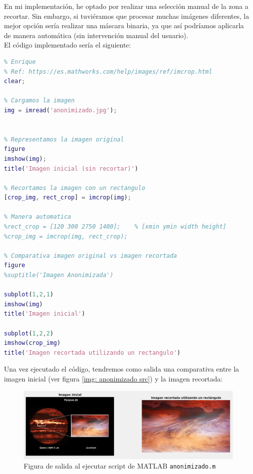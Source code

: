 \documentclass[12pt]{article}
\begin{document}
	\noindent En mi implementación, he optado por realizar una selección manual de la zona a recortar. Sin embargo, si tuviéramos que procesar muchas imágenes diferentes, la mejor opción sería realizar una máscara binaria, ya que así podríamos aplicarla de manera automática (sin intervención manual del usuario). \\
	
	\noindent El código implementado sería el siguiente:
	
	\begin{lstlisting}[language=Matlab, caption={Implementación anonimizado con \texttt{MATLAB}}]
% 1 - Anonimizado
% Enrique 
% Ref: https://es.mathworks.com/help/images/ref/imcrop.html
clear;

% Cargamos la imagen
img = imread('anonimizado.jpg');


% Representamos la imagen original
figure
imshow(img);
title('Imagen inicial (sin recortar)')

% Recortamos la imagen con un rectangulo
[crop_img, rect_crop] = imcrop(img);

% Manera automatica
%rect_crop = [120 300 2750 1400];    % [xmin ymin width height]
%crop_img = imcrop(img, rect_crop);

% Comparativa imagen original vs imagen recortada
figure
%suptitle('Imagen Anonimizada')

subplot(1,2,1)
imshow(img)
title('Imagen inicial')

subplot(1,2,2)
imshow(crop_img)
title('Imagen recortada utilizando un rectangulo')
	\end{lstlisting}

	\vspace{10px}

	\noindent Una vez ejecutado el código, tendremos como salida una comparativa entre la imagen inicial (ver figura \ref{img: anonimizado src}) y la imagen recortada:
	
	\begin{figure}[h]
		\begin{center}
			\includegraphics[width=1\textwidth]{img/anonimizado_output.png}
			\caption{Figura de salida al ejecutar script de MATLAB \texttt{anonimizado.m}}
			\label{img: anonimizado output}
		\end{center}
	\end{figure}
	
\end{document}
